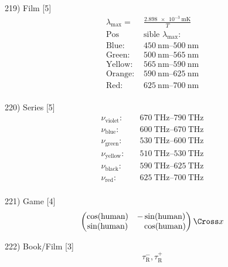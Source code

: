 \documentclass[10pt]{article}
\begin{document}
  219) Film [5]
  \[
    \begin{split}
      \lambda_\text{max} =&\frac{\SI{2.898e-3}{\metre\kelvin}}{T} \\
      \text{Pos} &\text{sible } \lambda_\text{max}: \\
      \text{Blue: } & \SI{450}{\nano\metre}\text{--}\SI{500}{\nano\metre} \\
      \text{Green: } & \SI{500}{\nano\metre}\text{--}\SI{565}{\nano\metre} \\
      \text{Yellow: } & \SI{565}{\nano\metre}\text{--}\SI{590}{\nano\metre} \\
      \text{Orange: } & \SI{590}{\nano\metre}\text{--}\SI{625}{\nano\metre} \\
      \text{Red: } & \SI{625}{\nano\metre}\text{--}\SI{700}{\nano\metre} \\
    \end{split}
  \]

  220) Series [5]
  \[
    \begin{split}
      \nu_\text{violet}:\quad&\SI{670}{\tera\hertz}\text{--}\SI{790}{\tera\hertz}\\
      \nu_\text{blue}: \quad& \SI{600}{\tera\hertz}\text{--}\SI{670}{\tera\hertz} \\
      \nu_\text{green}: \quad& \SI{530}{\tera\hertz}\text{--}\SI{600}{\tera\hertz} \\
      \nu_\text{yellow}: \quad& \SI{510}{\tera\hertz}\text{--}\SI{530}{\tera\hertz} \\
      \nu_\text{black}: \quad& \SI{590}{\tera\hertz}\text{--}\SI{625}{\tera\hertz} \\
      \nu_\text{red}: \quad& \SI{625}{\tera\hertz}\text{--}\SI{700}{\tera\hertz} \\
    \end{split}
  \]

  221) Game [4]
  \[
    \begin{pmatrix}
      \cos(\text{human}) & - \sin(\text{human}) \\
      \sin(\text{human}) & \phantom{-}\cos(\text{human}) \\
    \end{pmatrix}
      \text{\Cross}    x 
  \]

  222) Book/Film [3]
  \[
    \tau^-_\text{R}, \tau^+_\text{R} 
  \]
  
\end{document}
